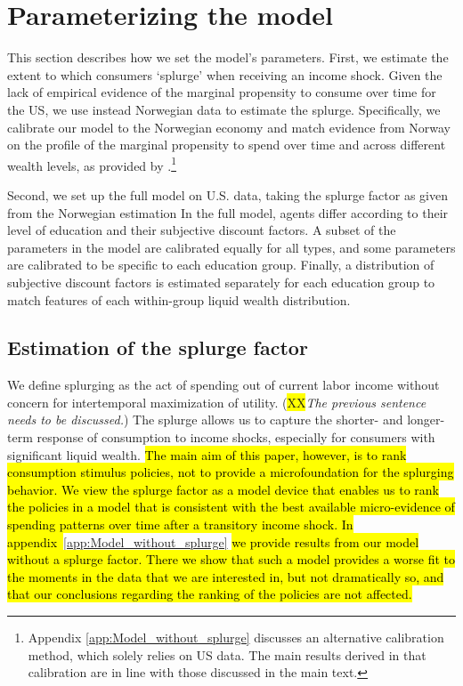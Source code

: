 \documentclass[\econtexRoot/HAFiscal]{subfiles}
\begin{document}
\hypertarget{parameterizing-the-model}{}\par\section{Parameterizing the model}

This section describes how we set the model's parameters. First, we estimate the extent to which consumers `splurge' when receiving an income shock. Given the lack of empirical evidence of the marginal propensity to consume over time for the US, we use instead Norwegian data to estimate the splurge. Specifically, we calibrate our model to the Norwegian economy and match evidence from Norway on the profile of the marginal propensity to spend over time and across different wealth levels, as provided by \citet{fagereng_mpc_2021}.\footnote{Appendix \ref{app:Model_without_splurge} discusses an alternative calibration method, which solely relies on US data. The main results derived in that calibration are in line with those discussed in the main text.} 

Second, we set up the full model on U.S. data, taking the splurge factor as given from the Norwegian estimation In the full model, agents differ according to their level of education and their subjective discount factors. A subset of the parameters in the model are calibrated equally for all types, and some parameters are calibrated to be specific to each education group. Finally, a distribution of subjective discount factors is estimated separately for each education group to match features of each within-group liquid wealth distribution.


\hypertarget{estimation-of-the-splurge-factor}{}\par\subsection{Estimation of the splurge factor}
\notinsubfile{\label{sec:splurge}}

We define splurging as the act of spending out of current labor income without concern for intertemporal maximization of utility. (\colorbox{yellow}{XX}\textit{The previous sentence needs to be discussed.}) The splurge allows us to capture the shorter- and longer-term response of consumption to income shocks, especially for consumers with significant liquid wealth. \hl{The main aim of this paper, however, is to rank consumption stimulus policies, not to provide a microfoundation for the splurging behavior. We view the splurge factor as a model device that enables us to rank the policies in a model that is consistent with the best available micro-evidence of spending patterns over time after a transitory income shock. In appendix~}\ref{app:Model_without_splurge} \hl{we provide results from our model without a splurge factor. There we show that such a model provides a worse fit to the moments in the data that we are interested in, but not dramatically so, and that our conclusions regarding the ranking of the policies are not affected.}
\end{document}
